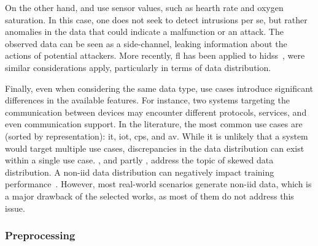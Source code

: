On the other hand, \textcite{zhang_BlockchainbasedFederatedLearning_2020} and \textcite{schneble_Attackdetectionusing_2019} use sensor values, such as hearth rate and oxygen saturation.
In this case, one does not seek to detect intrusions per se, but rather anomalies in the data that could indicate a malfunction or an attack.
The observed data can be seen as a side-channel, leaking information about the actions of potential attackers.
More recently, \gls{fl} has been applied to \glspl{hids}~\cite{guo_NewFederatedLearning_2023}, were similar considerations apply, particularly in terms of data distribution.

Finally, even when considering the same data type, use cases introduce significant differences in the available features.
For instance, two systems targeting the communication between devices may encounter different protocols, services, and even communication support.
In the literature, the most common use cases are (sorted by representation): \acrfull{it}, \acrfull{iot}, \acrfull{cps}, and \acrfull{av}.
While it is unlikely that a system would target multiple use cases, discrepancies in the data distribution can exist within a single use case.
\textcite{chen_Networkanomalydetection_2020}, and partly \textcite{hei_trustedfeatureaggregator_2020}, address the topic of skewed data distribution.
A non-\gls{iid} data distribution can negatively impact training performance~\cite{yang_FederatedMachineLearning_2019}.
However, most real-world scenarios generate non-\gls{iid} data, which is a major drawback of the selected works, as most of them do not address this issue.


\subsubsection{Preprocessing\label{sec:sota.quali.preprocess}}

